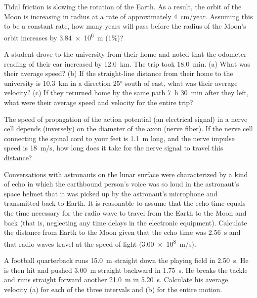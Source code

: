 \documentclass[main-ap-physics.tex]{subfiles}
\begin{document}
\begin{exercise}
    Tidal friction is slowing the rotation of the Earth. As a result, the orbit of the Moon is increasing in radius at a rate of approximately \SI{4}{cm/year}. Assuming this to be a constant rate, how many years will pass before the radius of the Moon’s orbit increases by \SI{3.84e6}{m} (1\%)?
\end{exercise}

\begin{exercise}
    A student drove to the university from their home and noted that the odometer reading of their car increased by \SI{12.0}{km}. The trip took \SI{18.0}{min}. (a) What was their average speed? (b) If the straight-line distance from their home to the university is \SI{10.3}{km} in a direction \ang{25} south of east, what was their average velocity? (c) If they returned home by the same path \SI{7}{h} \SI{30}{min} after they left, what were their average speed and velocity for the entire trip?
\end{exercise}

\begin{exercise}
    The speed of propagation of the action potential (an electrical signal) in a nerve cell depends (inversely) on the diameter of the axon (nerve fiber). If the nerve cell connecting the spinal cord to your feet is \SI{1.1}{m} long, and the nerve impulse speed is \SI{18}{m/s}, how long does it take for the nerve signal to travel this distance?
\end{exercise}

\begin{exercise}
    Conversations with astronauts on the lunar surface were characterized by a kind of echo in which the earthbound person's voice was so loud in the astronaut's space helmet that it was picked up by the astronaut's microphone and transmitted back to Earth. It is reasonable to assume that the echo time equals the time necessary for the radio wave to travel from the Earth to the Moon and back (that is, neglecting any time delays in the electronic equipment). Calculate the distance from Earth to the Moon given that the echo time was \SI{2.56}{s} and that radio waves travel at the speed of light (\SI{3.00e8}{m/s}).
\end{exercise}

\begin{exercise}
    A football quarterback runs \SI{15.0}{m} straight down the playing field in \SI{2.50}{s}. He is then hit and pushed \SI{3.00}{m} straight backward in \SI{1.75}{s}. He breaks the tackle and runs straight forward another \SI{21.0}{m} in \SI{5.20}{s}. Calculate his average velocity (a) for each of the three intervals and (b) for the entire motion.
\end{exercise}
\end{document}
